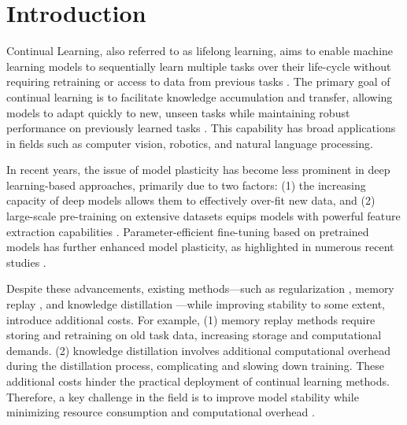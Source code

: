 \section{Introduction}



Continual Learning, also referred to as lifelong learning, aims to enable machine learning models to sequentially learn multiple tasks over their life-cycle without requiring retraining or access to data from previous tasks \cite{rebuffi2017icarl}. The primary goal of continual learning is to facilitate knowledge accumulation and transfer, allowing models to adapt quickly to new, unseen tasks while maintaining robust performance on previously learned tasks \cite{parisi2019continual}. This capability has broad applications in fields such as computer vision, robotics, and natural language processing.

In recent years, the issue of model plasticity has become less prominent in deep learning-based approaches, primarily due to two factors: (1) the increasing capacity of deep models allows them to effectively over-fit new data, and (2) large-scale pre-training on extensive datasets equips models with powerful feature extraction capabilities \cite{he2019rethinking}. Parameter-efficient fine-tuning based on pretrained models has further enhanced model plasticity, as highlighted in numerous recent studies \cite{houlsby2019parameter,lester-etal-2021-power,hu2022lora}.

Despite these advancements, existing methods—such as regularization \cite{kirkpatrick2017overcoming}, memory replay \cite{lopez2017gradient}, and knowledge distillation \cite{li2017learning}—while improving stability to some extent, introduce additional costs. For example, (1) memory replay methods require storing and retraining on old task data, increasing storage and computational demands. (2) knowledge distillation involves additional computational overhead during the distillation process, complicating and slowing down training. These additional costs hinder the practical deployment of continual learning methods. Therefore, a key challenge in the field is to improve model stability while minimizing resource consumption and computational overhead \cite{wang2024comprehensive}.

